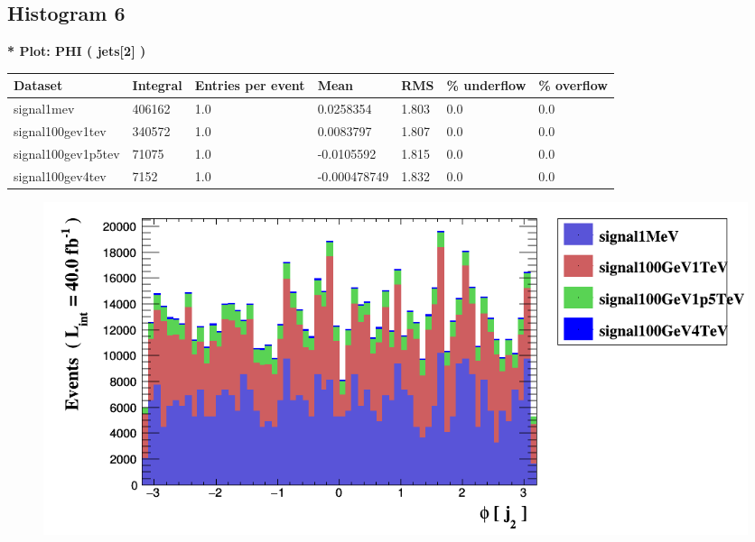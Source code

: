 \documentclass[a4paper, 10pt]{article}
\begin{document}
\subsection{ Histogram 6}

\textbf{* Plot: PHI ( jets[2] ) }\\
   \begin{table}[H]
  \begin{center}
    \begin{tabular}{|m{23.0mm}|m{23.0mm}|m{18.0mm}|m{19.0mm}|m{19.0mm}|m{19.0mm}|m{19.0mm}|}
      \hline
      {\cellcolor{yellow}         Dataset}& {\cellcolor{yellow}         Integral}& {\cellcolor{yellow}         Entries per event}& {\cellcolor{yellow}         Mean}& {\cellcolor{yellow}         RMS}& {\cellcolor{yellow}         \% underflow}& {\cellcolor{yellow}         \% overflow}\\
      \hline
      {\cellcolor{white}         signal1mev}& {\cellcolor{white}         406162}& {\cellcolor{white}         1.0}& {\cellcolor{white}         0.0258354}& {\cellcolor{white}         1.803}& {\cellcolor{green}         0.0}& {\cellcolor{green}         0.0}\\
      \hline
      {\cellcolor{white}         signal100gev1tev}& {\cellcolor{white}         340572}& {\cellcolor{white}         1.0}& {\cellcolor{white}         0.0083797}& {\cellcolor{white}         1.807}& {\cellcolor{green}         0.0}& {\cellcolor{green}         0.0}\\
      \hline
      {\cellcolor{white}         signal100gev1p5tev}& {\cellcolor{white}         71075}& {\cellcolor{white}         1.0}& {\cellcolor{white}         -0.0105592}& {\cellcolor{white}         1.815}& {\cellcolor{green}         0.0}& {\cellcolor{green}         0.0}\\
      \hline
      {\cellcolor{white}         signal100gev4tev}& {\cellcolor{white}         7152}& {\cellcolor{white}         1.0}& {\cellcolor{white}         -0.000478749}& {\cellcolor{white}         1.832}& {\cellcolor{green}         0.0}& {\cellcolor{green}         0.0}\\
\hline
    \end{tabular}
  \end{center}
\end{table}

\begin{figure}[H]
  \begin{center}
    \includegraphics[scale=0.45]{selection_5.png}\\
\caption{   }
  \end{center}
\end{figure}
      \newpage
\end{document}
